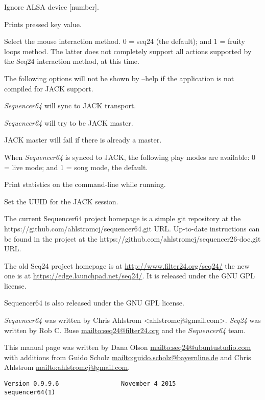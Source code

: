       Ignore ALSA device [number].

      Prints pressed key value.

      Select the mouse interaction method.
      0 = seq24 (the default); and 1 = fruity loops method.
      The latter does not completely support all actions supported by the Seq24
      interaction method, at this time.

      The following options will not be shown by --help if the application is
      not compiled for JACK support.

      \textsl{Sequencer64} will sync to JACK transport.

      \textsl{Sequencer64} will try to be JACK master.

      JACK master will fail if there is already a master.

      When \textsl{Sequencer64} is synced to JACK, the following play modes
      are available: 0 = live mode; and 1 = song mode, the default.

      Print statistics on the command-line while running.

      Set the UUID for the JACK session.

   The current Sequencer64 project homepage is a simple git repository at the
   https://github.com/ahlstromcj/sequencer64.git URL.
   Up-to-date instructions can be found in the project at the
   https://github.com/ahlstromcj/sequencer26-doc.git URL.

   The old Seq24 project homepage is at
   \url{http://www.filter24.org/seq24/} the new
   one is at \url{https://edge.launchpad.net/seq24/}.
   It is released under the GNU GPL license.

   Sequencer64 is also released under the GNU GPL license.

   \textsl{Sequencer64} was written by Chris Ahlstrom <ahlstromcj@gmail.com>.
   \textsl{Seq24} was written by Rob C. Buse \url{mailto:seq24@filter24.org}
   and the \textsl{Sequencer64} team.

   This manual page was written by Dana Olson
   \url{mailto:seq24@ubuntustudio.com} with additions from Guido Scholz
   \url{mailto:guido.scholz@bayernline.de} and Chris Ahlstrom
   \url{mailto:ahlstromcj@gmail.com}.

   \begin{verbatim}
Version 0.9.9.6                 November 4 2015                  sequencer64(1)
   \end{verbatim}

